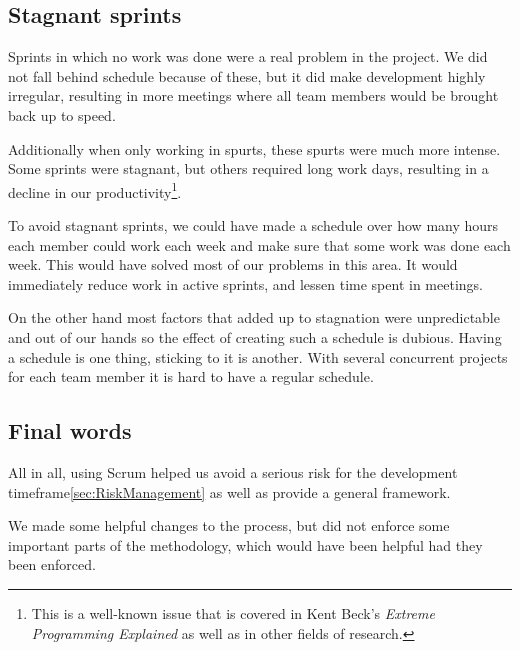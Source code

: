 \subsection{Stagnant sprints}

Sprints in which no work was done were a real problem in the project. We did not fall behind schedule because
of these, but it did make development highly irregular, resulting in more meetings where all team members
would be brought back up to speed.

Additionally when only working in spurts, these spurts were much more intense. Some sprints were stagnant, but
others required long work days, resulting in a decline in our productivity\footnote{This is a well-known issue
that is covered in Kent Beck's \emph{Extreme Programming Explained}\cite{xpe} as well as in other fields of
research\cite{workingtime}.}.

To avoid stagnant sprints, we could have made a schedule over how many hours each member could work each week
and make sure that some work was done each week. This would have solved most of our problems in this area. It
would immediately reduce work in active sprints, and lessen time spent in meetings.

On the other hand most factors that added up to stagnation were unpredictable and out of our hands so the effect
of creating such a schedule is dubious. Having a schedule is one thing, sticking to it is another. With several
concurrent projects for each team member it is hard to have a regular schedule.

\subsection{Final words}

All in all, using Scrum helped us avoid a serious risk for the development timeframe\ref{sec:RiskManagement} as
well as provide a general framework.

We made some helpful changes to the process, but did not enforce some important parts of the methodology, which
would have been helpful had they been enforced.